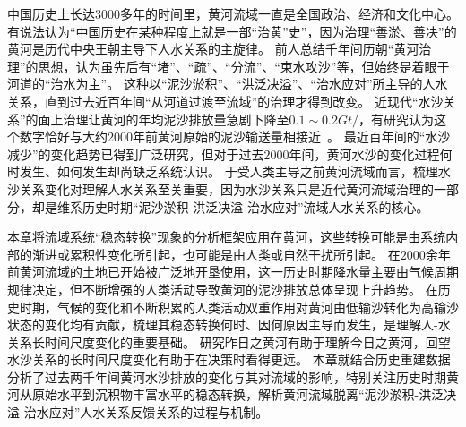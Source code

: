 

中国历史上长达3000多年的时间里，黄河流域一直是全国政治、经济和文化中心。
有说法认为“中国历史在某种程度上就是一部“治黄”史”，因为治理“善淤、善决”的黄河是历代中央王朝主导下人水关系的主旋律。
前人总结千年间历朝“黄河治理”的思想，认为虽先后有“堵”、“疏”、“分流”、“束水攻沙”等，但始终是着眼于河道的“治水为主”\cite{WangWeiJing2009}。
这种以“泥沙淤积”、“洪泛决溢”、“治水应对”所主导的人水关系，直到过去近百年间“从河道过渡至流域”的治理才得到改变。
近现代“水沙关系”的面上治理让黄河的年均泥沙排放量急剧下降至$0.1\sim0.2 Gt/$，有研究认为这个数字恰好与大约$2000$年前黄河原始的泥沙输送量相接近~\cite{wang2007}。
最近百年间的“水沙减少”的变化趋势已得到广泛研究\cite{wei2016, song2020, wang2016a}，但对于过去$2000$年间，黄河水沙的变化过程何时发生、如何发生却尚缺乏系统认识。
于受人类主导之前黄河流域而言，梳理水沙关系变化对理解人水关系至关重要，因为水沙关系只是近代黄河流域治理的一部分，却是维系历史时期“泥沙淤积-洪泛决溢-治水应对”流域人水关系的核心。

本章将流域系统“稳态转换”现象的分析框架应用在黄河，这些转换可能是由系统内部的渐进或累积性变化所引起，也可能是由人类或自然干扰所引起。
在$2000$余年前黄河流域的土地已开始被广泛地开垦使用，这一历史时期降水量主要由气候周期规律决定，但不断增强的人类活动导致黄河的泥沙排放总体呈现上升趋势\cite{wang2007}。
在历史时期，气候的变化和不断积累的人类活动双重作用对黄河由低输沙转化为高输沙状态的变化均有贡献，梳理其稳态转换何时、因何原因主导而发生，是理解人-水关系长时间尺度变化的重要基础。
研究昨日之黄河有助于理解今日之黄河，回望水沙关系的长时间尺度变化有助于在决策时看得更远。
本章就结合历史重建数据分析了过去两千年间黄河水沙排放的变化与其对流域的影响，特别关注历史时期黄河从原始水平到沉积物丰富水平的稳态转换，解析黄河流域脱离“泥沙淤积-洪泛决溢-治水应对”人水关系反馈关系的过程与机制。


